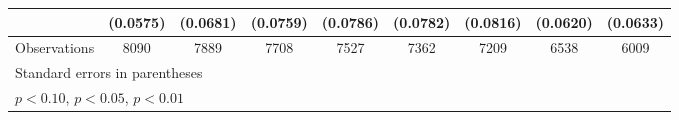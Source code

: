 \begin{table}[htbp]
\begin{tabular}{l*{8}{c}}
                    &    (0.0575)         &    (0.0681)         &    (0.0759)         &    (0.0786)         &    (0.0782)         &    (0.0816)         &    (0.0620)         &    (0.0633)         \\
\hline
Observations        &        8090         &        7889         &        7708         &        7527         &        7362         &        7209         &        6538         &        6009         \\
\hline\hline
\multicolumn{9}{l}{\footnotesize Standard errors in parentheses}\\
\multicolumn{9}{l}{\footnotesize \sym{*} \(p<0.10\), \sym{**} \(p<0.05\), \sym{***} \(p<0.01\)}\\
\end{tabular}
\end{table}
